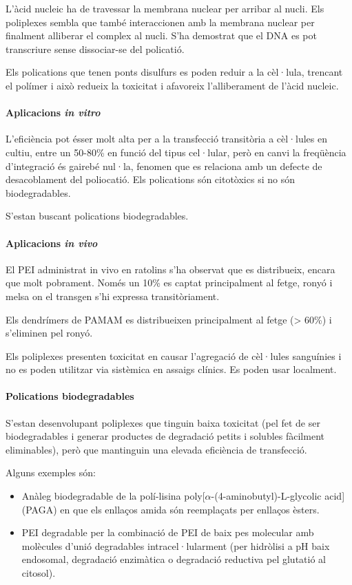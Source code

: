 L'àcid nucleic ha de travessar la membrana nuclear per arribar al nucli. Els poliplexes sembla que també interaccionen amb la membrana nuclear per finalment alliberar el complex al nucli. S'ha demostrat que el DNA es pot transcriure sense dissociar-se del policatió.

Els polications que tenen ponts disulfurs es poden reduir a la cèl·lula, trencant el polímer i això redueix la toxicitat i afavoreix l'alliberament de l'àcid nucleic.

\paragraph{Aplicacions \textit{in vitro}}
L'eficiència pot ésser molt alta per a la transfecció transitòria a cèl·lules en cultiu, entre un 50-80\% en funció del tipus cel·lular, però en canvi la freqüència d'integració és gairebé nul·la, fenomen que es relaciona amb un defecte de desacoblament del poliocatió.
Els polications són citotòxics si no són biodegradables.

S'estan buscant polications biodegradables.

\paragraph{Aplicacions \textit{in vivo}}
El PEI administrat in vivo en ratolins s'ha observat que es distribueix, encara que molt pobrament. Només un 10\% es captat principalment al fetge, ronyó i melsa on el transgen s'hi expressa transitòriament.

Els dendrímers de PAMAM es distribueixen principalment al fetge (> 60\%) i s'eliminen pel ronyó.

Els poliplexes presenten toxicitat en causar l'agregació de cèl·lules sanguínies i no es poden utilitzar via sistèmica en assaigs clínics. Es poden usar localment.

\paragraph{Polications biodegradables}
S'estan desenvolupant poliplexes que tinguin baixa toxicitat (pel fet de ser biodegradables i generar productes de degradació petits i solubles fàcilment eliminables), però que mantinguin una elevada eficiència de transfecció.

Alguns exemples són:
\begin{itemize}
\item Anàleg biodegradable de la polí-lisina poly[$\alpha$-(4-aminobutyl)-L-glycolic acid] (PAGA) en que els enllaços amida són reemplaçats per enllaços èsters.

\item PEI degradable per la combinació de PEI de baix pes molecular amb molècules d'unió degradables intracel·lularment (per hidròlisi a pH baix endosomal, degradació enzimàtica o degradació reductiva pel glutatió al citosol).
\end{itemize}

